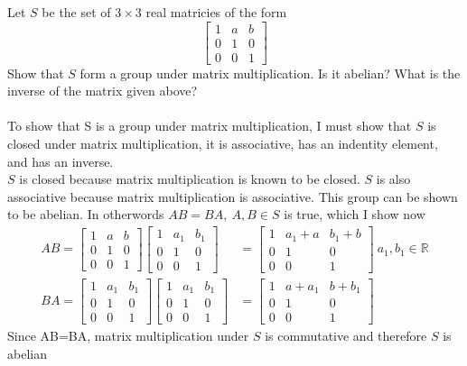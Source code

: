 \documentclass[titlepage]{article}
\newenvironment{problem}[2][Problem]{\begin{trivlist}
\item[\hskip \labelsep {\bfseries #1}\hskip \labelsep {\bfseries #2.}]}{\end{trivlist}}
\begin{document}
\begin{problem}{11}
Let $S$ be the set of $3\times 3$ real matricies of the form
$$\begin{bmatrix}1&a&b\\0&1&0\\0&0&1\end{bmatrix} $$
Show that $S$ form a group under matrix multiplication. Is it abelian? What is the inverse of the matrix given above?\\
\\
To show that S is a group under matrix multiplication, I must show that $S$ is closed under matrix multiplication, it is associative, has an indentity element, and has an inverse.
\\
$S$ is closed because matrix multiplication is known to be closed. $S$ is also associative because matrix multiplication is associative. This group can be shown to be abelian. In otherwords $AB = BA , \ A,B\in S$ is true, which I show now
\begin{align*}
AB =\begin{bmatrix}1&a&b\\0&1&0\\0&0&1\end{bmatrix} \begin{bmatrix}1&a_1&b_1\\0&1&0\\0&0&1\end{bmatrix} &= \begin{bmatrix}1&a_1+a&b_1+b\\0&1&0\\0&0&1\end{bmatrix}  \ a_1,b_1 \in \mathbb{R} 
\\
BA = \begin{bmatrix}1&a_1&b_1\\0&1&0\\0&0&1\end{bmatrix} \begin{bmatrix}1&a_1&b_1\\0&1&0\\0&0&1\end{bmatrix} &= \begin{bmatrix}1&a+a_1&b+b_1\\0&1&0\\0&0&1\end{bmatrix}  
\end{align*}
Since AB=BA, matrix multiplication under $S$ is commutative and therefore $S$ is abelian
\\

\end{problem}
\end{document}
